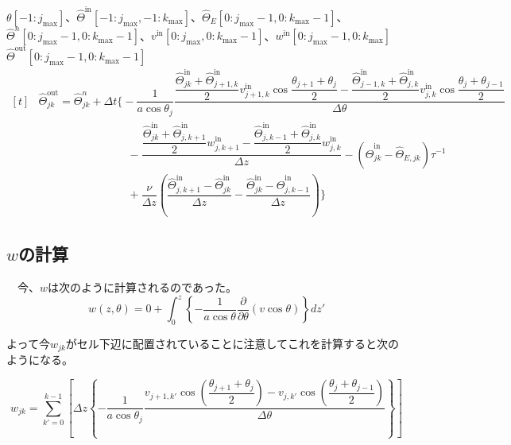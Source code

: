 \documentclass[ja=standard,xelatex]{bxjsarticle}
\newcommand{\neqn}[1]{\begin{equation}{#1}\end{equation}}
\newcommand{\pdifop}[1]{\dfrac{\partial}{\partial#1}}
\newcommand{\dint}{\displaystyle\int}
\newcommand{\dsum}{\displaystyle\sum}
\newcommand{\bracketnormal}[1]{\left(#1\right)}
\newcommand{\curlybracket}[1]{\left\{#1\right\}}
\begin{document}
\begin{algorithm}[H]
  \caption*{\textbf{subroutine:} update\_potential\_temperature}
  \begin{algorithmic}[1]
    \Require $\theta[-1:j_\text{max}]$、$\hat{\Theta}^\text{in}[-1:j_\text{max},-1:k_\text{max}]$、$\hat{\Theta}_E[0:j_\text{max}-1,0:k_\text{max}-1]$、$\hat{\Theta}^n[0:j_\text{max}-1,0:k_\text{max}-1]$、$v^\text{in}[0:j_\text{max},0:k_\text{max}-1]$、$w^\text{in}[0:j_\text{max}-1,0:k_\text{max}]$
    \Ensure $\hat{\Theta}^\text{out}[0:j_\text{max}-1,0:k_\text{max}-1]$
    \Statex
    \State $\begin{aligned}[t]
      &\hat{\Theta}^\text{out}_{jk} = \hat{\Theta}^n_{jk} + \Delta t\Bigg\{-\dfrac{1}{a\cos\theta_j}\dfrac{\dfrac{\hat{\Theta}^\text{in}_{jk}+\hat{\Theta}^\text{in}_{j+1,k}}{2}v^\text{in}_{j+1,k}\cos\dfrac{\theta_{j+1}+\theta_{j}}{2}-\dfrac{\hat{\Theta}^\text{in}_{j-1,k}+\hat{\Theta}^\text{in}_{j,k}}{2}v^\text{in}_{j,k}\cos\dfrac{\theta_{j}+\theta_{j-1}}{2}}{\Delta \theta}\\[5pt]
      &\qquad\qquad\qquad\qquad - \dfrac{\dfrac{\hat{\Theta}^\text{in}_{jk}+\hat{\Theta}^\text{in}_{j,k+1}}{2}w^\text{in}_{j,k+1}-\dfrac{\hat{\Theta}^\text{in}_{j,k-1}+\hat{\Theta}^\text{in}_{j,k}}{2}w^\text{in}_{j,k}}{\Delta z}-\bracketnormal{\hat{\Theta}^\text{in}_{jk}-\hat{\Theta}_{E,jk}}\tau^{-1}\\[5pt]
      &\qquad\qquad\qquad\qquad + \dfrac{\nu}{\Delta z}\bracketnormal{\dfrac{\hat{\Theta}^\text{in}_{j,k+1}-\hat{\Theta}^\text{in}_{jk}}{\Delta z}-\dfrac{\hat{\Theta}^\text{in}_{jk}-\hat{\Theta}^\text{in}_{j,k-1}}{\Delta z}}\Bigg\}
    \end{aligned}$
    \EndDo
    \EndDo
  \end{algorithmic}
\end{algorithm}

\subsection{\texorpdfstring{$w$の計算}{wの計算}}

　今、$w$は次のように計算されるのであった。
\neqn{
  w\bracketnormal{z,\theta} = 0 + \dint_{0}^z \curlybracket{-\dfrac{1}{a\cos\theta}\pdifop{\theta}\bracketnormal{v\cos\theta}}dz'
}

よって今$w_{jk}$がセル下辺に配置されていることに注意してこれを計算すると次のようになる。

\neqn{
  w_{jk} = \dsum_{k'=0}^{k-1}\left[\Delta z \curlybracket{-\dfrac{1}{a\cos\theta_j}\dfrac{v_{j+1,k'}\cos\bracketnormal{\dfrac{\theta_{j+1}+\theta_{j}}{2}}-v_{j,k'}\cos\bracketnormal{\dfrac{\theta_{j}+\theta_{j-1}}{2}}}{\Delta \theta}}\right]
}
\end{document}
